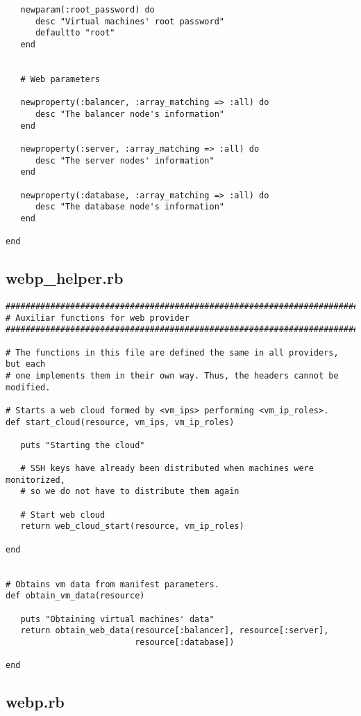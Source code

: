 \begin{lstlisting}
   newparam(:root_password) do
      desc "Virtual machines' root password"
      defaultto "root"
   end


   # Web parameters
   
   newproperty(:balancer, :array_matching => :all) do
      desc "The balancer node's information"
   end
   
   newproperty(:server, :array_matching => :all) do
      desc "The server nodes' information"
   end
   
   newproperty(:database, :array_matching => :all) do
      desc "The database node's information"
   end

end
\end{lstlisting}


\subsection{webp\_helper.rb}


\begin{lstlisting}
################################################################################
# Auxiliar functions for web provider
################################################################################

# The functions in this file are defined the same in all providers, but each
# one implements them in their own way. Thus, the headers cannot be modified.

# Starts a web cloud formed by <vm_ips> performing <vm_ip_roles>.
def start_cloud(resource, vm_ips, vm_ip_roles)

   puts "Starting the cloud"
   
   # SSH keys have already been distributed when machines were monitorized,
   # so we do not have to distribute them again
   
   # Start web cloud
   return web_cloud_start(resource, vm_ip_roles)

end


# Obtains vm data from manifest parameters.
def obtain_vm_data(resource)

   puts "Obtaining virtual machines' data"
   return obtain_web_data(resource[:balancer], resource[:server],
                          resource[:database])
   
end
\end{lstlisting}


\subsection{webp.rb}



